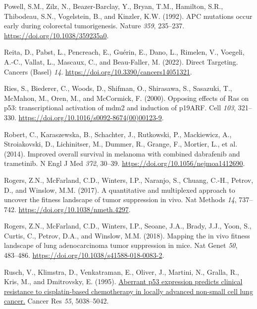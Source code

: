 \begin{CSLReferences}{0}{0}
\leavevmode{}%
Powell, S.M., Zilz, N., Beazer-Barclay, Y., Bryan, T.M., Hamilton, S.R., Thibodeau, S.N., Vogelstein, B., and Kinzler, K.W. (1992). APC mutations occur early during colorectal tumorigenesis. Nature \emph{359}, 235--237. \url{https://doi.org/10.1038/359235a0}.

\leavevmode{}%
Reita, D., Pabst, L., Pencreach, E., Guérin, E., Dano, L., Rimelen, V., Voegeli, A.-C., Vallat, L., Mascaux, C., and Beau-Faller, M. (2022). Direct Targeting. Cancers (Basel) \emph{14}. \url{https://doi.org/10.3390/cancers14051321}.

\leavevmode{}%
Ries, S., Biederer, C., Woods, D., Shifman, O., Shirasawa, S., Sasazuki, T., McMahon, M., Oren, M., and McCormick, F. (2000). Opposing effects of Ras on p53: transcriptional activation of mdm2 and induction of p19ARF. Cell \emph{103}, 321--330. \url{https://doi.org/10.1016/s0092-8674(00)00123-9}.

\leavevmode{}%
Robert, C., Karaszewska, B., Schachter, J., Rutkowski, P., Mackiewicz, A., Stroiakovski, D., Lichinitser, M., Dummer, R., Grange, F., Mortier, L., et al. (2014). Improved overall survival in melanoma with combined dabrafenib and trametinib. N Engl J Med \emph{372}, 30--39. \url{https://doi.org/10.1056/nejmoa1412690}.

\leavevmode{}%
Rogers, Z.N., McFarland, C.D., Winters, I.P., Naranjo, S., Chuang, C.-H., Petrov, D., and Winslow, M.M. (2017). A quantitative and multiplexed approach to uncover the fitness landscape of tumor suppression in vivo. Nat Methods \emph{14}, 737--742. \url{https://doi.org/10.1038/nmeth.4297}.

\leavevmode{}%
Rogers, Z.N., McFarland, C.D., Winters, I.P., Seoane, J.A., Brady, J.J., Yoon, S., Curtis, C., Petrov, D.A., and Winslow, M.M. (2018). Mapping the in vivo fitness landscape of lung adenocarcinoma tumor suppression in mice. Nat Genet \emph{50}, 483--486. \url{https://doi.org/10.1038/s41588-018-0083-2}.

\leavevmode{}%
Rusch, V., Klimstra, D., Venkatraman, E., Oliver, J., Martini, N., Gralla, R., Kris, M., and Dmitrovsky, E. (1995). \href{https://www.ncbi.nlm.nih.gov/pubmed/7585548}{Aberrant p53 expression predicts clinical resistance to cisplatin-based chemotherapy in locally advanced non-small cell lung cancer.} Cancer Res \emph{55}, 5038--5042.


\end{CSLReferences}
